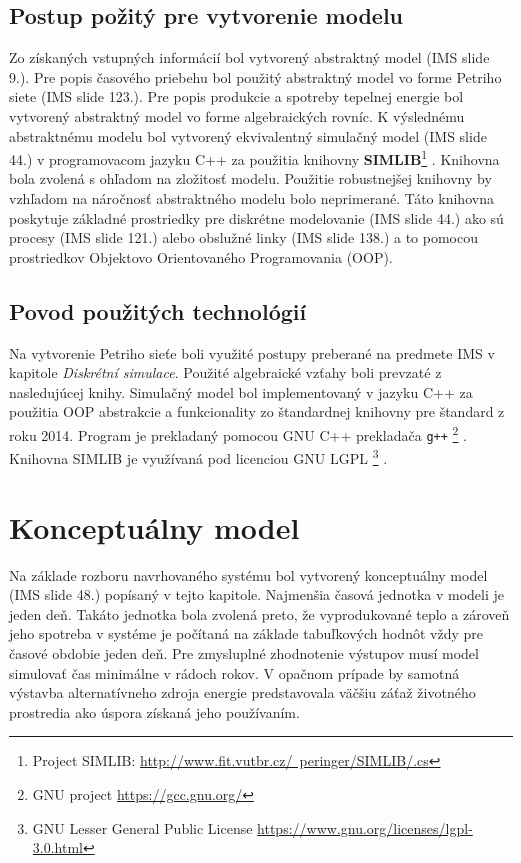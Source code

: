 \documentclass[a4paper, 11pt]{article}
\begin{document}
\subsection{Postup požitý pre vytvorenie modelu}

Zo získaných vstupných informácií bol vytvorený abstraktný model (IMS\cite{ims_slides} slide 9.). Pre popis časového priebehu bol použitý abstraktný model vo forme Petriho siete (IMS\cite{ims_slides} slide 123.). Pre popis produkcie a spotreby tepelnej energie bol vytvorený abstraktný model vo forme algebraických rovníc. K výslednému abstraktnému modelu bol vytvorený ekvivalentný simulačný model (IMS\cite{ims_slides} slide 44.) v programovacom jazyku C++ za použitia knihovny \textbf{SIMLIB}\footnote{Project SIMLIB: \href{http://www.fit.vutbr.cz/~peringer/SIMLIB/.cs}{http://www.fit.vutbr.cz/~peringer/SIMLIB/.cs}} . Knihovna bola zvolená s ohľadom na zložitosť modelu. Použitie robustnejšej knihovny by vzhľadom na náročnosť abstraktného modelu bolo neprimerané. Táto knihovna poskytuje základné prostriedky pre diskrétne modelovanie (IMS\cite{ims_slides} slide 44.) ako sú procesy (IMS\cite{ims_slides} slide 121.) alebo obslužné linky (IMS\cite{ims_slides} slide 138.) a to pomocou prostriedkov Objektovo Orientovaného Programovania (OOP).

\subsection{Povod použitých technológií}
Na vytvorenie Petriho sieťe boli využité postupy preberané na predmete IMS\cite{ims_slides} v kapitole \textit{Diskrétní simulace}. Použité algebraické vzťahy boli prevzaté z nasledujúcej knihy\cite{Cihelka}. Simulačný model bol implementovaný v jazyku C++ za použitia OOP abstrakcie a funkcionality zo štandardnej knihovny pre štandard z roku 2014. Program je prekladaný pomocou GNU C++ prekladača \texttt{g++} \footnote{GNU project \href{https://gcc.gnu.org/}{https://gcc.gnu.org/}} . Knihovna SIMLIB je využívaná pod licenciou GNU LGPL \footnote{GNU Lesser General Public License \href{https://www.gnu.org/licenses/lgpl-3.0.html}{https://www.gnu.org/licenses/lgpl-3.0.html}} . 

\section{Konceptuálny model}
Na základe rozboru navrhovaného systému bol vytvorený konceptuálny model (IMS\cite{ims_slides} slide 48.) popísaný v tejto kapitole.  Najmenšia časová jednotka v modeli je jeden deň. Takáto jednotka bola zvolená preto, že vyprodukované teplo a zároveň jeho spotreba v systéme je počítaná na základe tabuľkových hodnôt vždy pre časové obdobie jeden deň. Pre zmysluplné zhodnotenie výstupov musí model simulovať čas minimálne v rádoch rokov. V opačnom prípade by samotná výstavba alternatívneho zdroja energie predstavovala väčšiu záťaž životného prostredia ako úspora získaná jeho používaním. 
\end{document}
